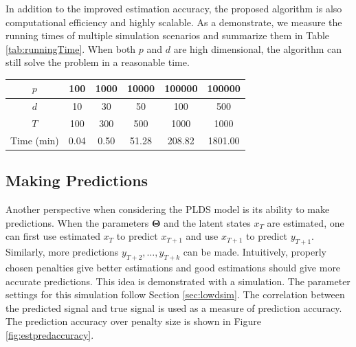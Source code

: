 \documentclass[fleqn]{article}
\let\oldref\ref
\renewcommand{\ref}[1]{(\oldref{#1})}
\begin{document}
In addition to the improved estimation accuracy, the proposed algorithm is also computational efficiency and highly scalable. As a demonstrate, we measure the running times of multiple simulation scenarios and summarize them in Table \oldref{tab:runningTime}. When both $p$ and $d$ are high dimensional, the algorithm can still solve the problem in a reasonable time.
\begin{center}
\label{tab:runningTime}
\begin{tabular}{c|ccccc}
\hline\hline
$p$ & 100 & 1000 & 10000 & 100000 & 100000\\
\hline
$d$ & 10 & 30 & 50 & 100 & 500 \\
\hline
$T$ & 100 & 300 & 500 & 1000 & 1000 \\
\hline
Time (min)& 0.04 & 0.50  & 51.28 & 208.82 & 1801.00 \\
\hline\hline
\end{tabular}
\end{center}
\subsection{Making Predictions}
Another perspective when considering the PLDS model is its ability to make predictions. When the parameters $\mathbf{\Theta}$ and the latent states $x_T$ are estimated, one can first use estimated $x_T$ to predict $x_{T+1}$ and use $x_{T+1}$ to predict $y_{T+1}$. Similarly, more predictions $y_{T+2},\ldots, y_{T+k}$ can be made. Intuitively, properly chosen penalties give better estimations and good estimations should give more accurate predictions. This idea is demonstrated with a simulation. The parameter settings for this simulation follow Section \oldref{sec:lowdsim}. The correlation between the predicted signal and true signal is used as a measure of prediction accuracy. The prediction accuracy over penalty size is shown in Figure \oldref{fig:estpredaccuracy}.


\end{document}
